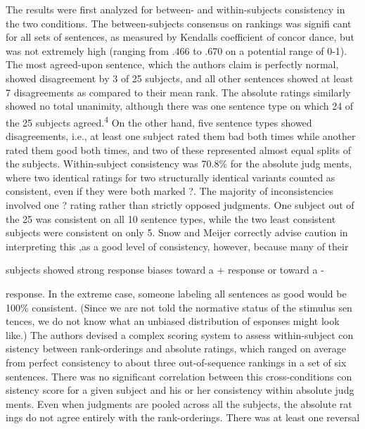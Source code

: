 \begin{styleStandard}
The results were first analyzed for between- and within-subjects consistency in the two conditions. The between-subjects consensus on rankings was signifi\- cant for all sets of sentences, as measured by Kendall{\textquotesingle}s coefficient of concor\- dance, but was not extremely high (ranging from .466 to .670 on a potential range of 0-1). The most agreed-upon sentence, which the authors claim is perfectly normal, showed disagreement by 3 of 25 subjects, and all other sentences showed at least 7 disagreements as compared to their mean rank. The absolute ratings similarly showed no total unanimity, although there was one sentence type on which 24 of the 25 subjects agreed.\textsuperscript{4}\textsuperscript{ }On the other hand, five sentence types showed disagreements, i.e., at least one subject rated them bad both times while another rated them good both times, and two of these represented almost equal splits of the subjects. Within-subject consistency was 70.8\% for the absolute judg\- ments, where two identical ratings for two structurally identical variants counted as consistent, even if they were both marked {\textquotedbl}?{\textquotedbl}. The majority of inconsistencies involved one {\textquotedbl}?{\textquotedbl} rating rather than strictly opposed judgments. One subject out of the 25 was consistent on all 10 sentence types, while the two least consistent subjects were consistent on only 5. Snow and Meijer correctly advise caution in interpreting this ,as a good level of consistency, however, because many of their
\end{styleStandard}


\begin{styleStandard}
subjects showed strong response biases toward a {\textquotedbl}+{\textquotedbl} response or toward a {\textquotedbl}{}-{\textquotedbl}
\end{styleStandard}


\begin{styleStandard}
response. In the extreme case, someone labeling all sentences as good would be 100\% consistent. (Since we are not told the normative status of the stimulus sen\- tences, we do not know what an unbiased distribution of esponses might look like.) The authors devised a complex scoring system to assess within-subject con\- sistency between rank-orderings and absolute ratings, which ranged on average from perfect consistency to about three out-of-sequence rankings in a set of six sentences. There was no significant correlation between this cross-conditions con\- sistency score for a given subject and his or her consistency within absolute judg\- ments. Even when judgments are pooled across all the subjects, the absolute rat\- ings do not agree entirely with the rank-orderings. There was at least one reversal
\end{styleStandard}


